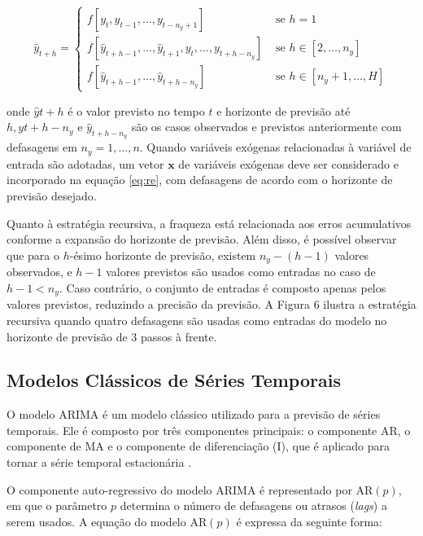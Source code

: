 \begin{equation}
	\hat{y}_{t+h}= \begin{cases}f\left[y_t, y_{t-1}, \ldots, y_{t-n_y+1}\right] & \text { se } h=1 \\ f\left[\hat{y}_{t+h-1}, \ldots, \hat{y}_{t+1}, y_t, \ldots, y_{t+h-n_y}\right] & \text { se } h \in\left[2, \ldots, n_y\right] \\ f\left[\hat{y}_{t+h-1}, \ldots, \hat{y}_{t+h-n_y}\right] & \text { se } h \in\left[n_y+1, \ldots, H\right]\end{cases} \label{eq:re}
\end{equation}

\noindent onde $\hat{y}{t+h}$ é o valor previsto no tempo $t$ e horizonte de previsão até $h, y{t+h-n_y}$ e $\hat{y}_{t+h-n_y}$ são os casos observados e previstos anteriormente com defasagens em $n_y=1, \ldots, n$. Quando variáveis exógenas relacionadas à variável de entrada são adotadas, um vetor $\boldsymbol{x}$ de variáveis exógenas deve ser considerado e incorporado na equação \eqref{eq:re}, com defasagens de acordo com o horizonte de previsão desejado.

Quanto à estratégia recursiva, a fraqueza está relacionada aos erros acumulativos conforme a expansão do horizonte de previsão. Além disso, é possível observar que para o $h$-ésimo horizonte de previsão, existem $n_y-(h-1)$ valores observados, e $h-1$ valores previstos são usados como entradas no caso de $h-1<n_y$. Caso contrário, o conjunto de entradas é composto apenas pelos valores previstos, reduzindo a precisão da previsão. A Figura 6 ilustra a estratégia recursiva quando quatro defasagens são usadas como entradas do modelo no horizonte de previsão de 3 passos à frente.



 
 \subsection{Modelos Cl\'assicos de S\'eries Temporais}\label{subsec:arima}

O modelo ARIMA é um modelo clássico utilizado para a previsão de séries temporais. Ele é composto por três componentes principais: o componente AR, o componente de MA e o componente de diferenciação (I), que é aplicado para tornar a série temporal estacionária \cite{prabhakaran2018arima}. 

O componente auto-regressivo do modelo ARIMA é representado por AR$(p)$, em que o parâmetro $p$ determina o número de defasagens ou atrasos (\textit{lags}) a serem usados. A equação do modelo AR$(p)$ é expressa da seguinte forma:
 
